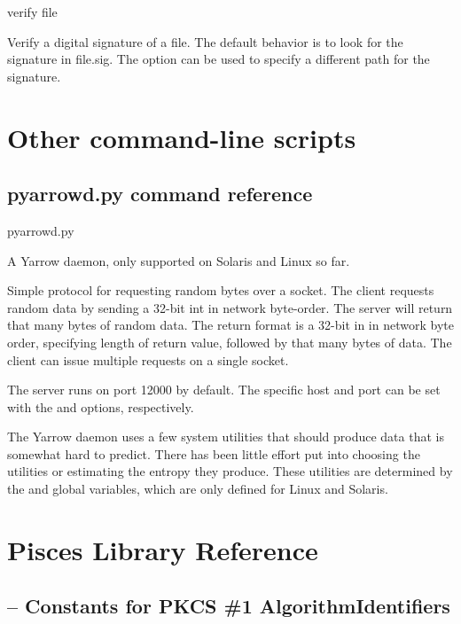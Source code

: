 \documentclass{howto}
\begin{document}
\begin{datadescni}{verify  file}

    Verify a digital signature of a file.  The default behavior is to
    look for the signature in file.sig.  The  option
    can be used to specify a different path for the signature.
\end{datadescni}
    
\section{Other command-line scripts}

\subsection{pyarrowd.py command reference}

\begin{datadescni}{pyarrowd.py  }

A Yarrow daemon, only supported on Solaris and Linux so far.

Simple protocol for requesting random bytes over a socket.  The client
requests random data by sending a 32-bit int in network byte-order.
The server will return that many bytes of random data.  The return
format is a 32-bit in in network byte order, specifying length of
return value, followed by that many bytes of data.  The client can
issue multiple requests on a single socket.

The server runs on port 12000 by default.  The specific host and port
can be set with the  and 
options, respectively.

The Yarrow daemon uses a few system utilities that should produce data
that is somewhat hard to predict.  There has been little effort put
into choosing the utilities or estimating the entropy they produce.
These utilities are determined by the  and
 global variables, which are only defined for
Linux and Solaris.

\end{datadescni}

\section{Pisces Library Reference}

\subsection{ 
	-- Constants for PKCS \#1 AlgorithmIdentifiers}
\end{document}
